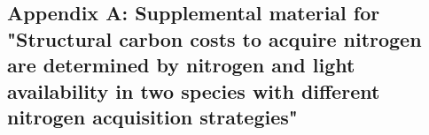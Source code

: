 \begin{singlespace}
    \chapter{\textbf{Appendix A: Supplemental material for "Structural carbon costs to acquire nitrogen are determined by nitrogen and light availability in two species with different nitrogen acquisition strategies"}}
\end{singlespace}

\setcounter{table}{0}
\renewcommand{\thetable}{A\arabic{table}}

\setcounter{figure}{0}
\renewcommand{\thefigure}{A\arabic{figure}}

\begin{table}[h!]
    \caption[Summary table containing volumes of compounds used to create modified Hoagland's solutions for each soil nitrogen fertilization treatment]{Summary table containing volumes of compounds used to create modified Hoagland's solutions for each soil nitrogen fertilization treatment. All volumes are expressed as milliliters per liter (mL L$^{-1}$)}
    \label{table:tab.a1}
\end{table}
